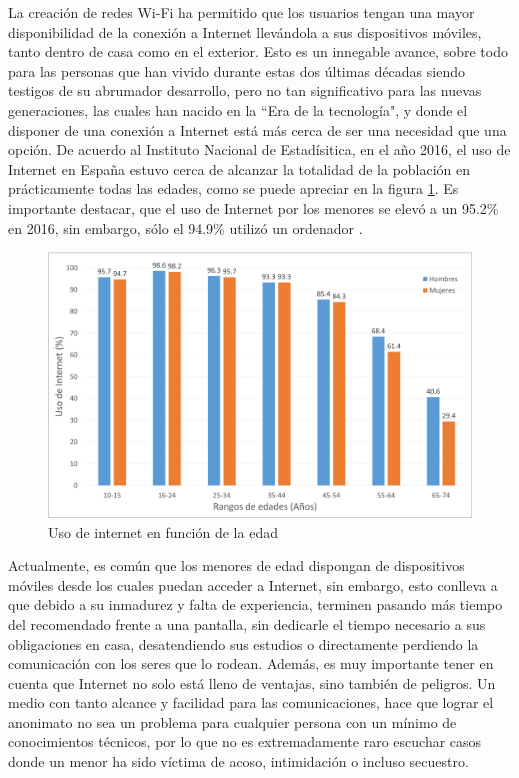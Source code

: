 \documentclass[12pt, twoside]{article}
\begin{document}
La creación de redes Wi-Fi ha permitido que los usuarios tengan una mayor disponibilidad de la conexión a Internet llevándola a sus dispositivos móviles, tanto dentro de casa como en el exterior. Esto es un innegable avance, sobre todo para las personas que han vivido durante estas dos últimas décadas siendo testigos de su abrumador desarrollo, pero no tan significativo para las nuevas generaciones, las cuales han nacido en la ``Era de la tecnología", y donde el disponer de una conexión a Internet está más cerca de ser una necesidad que una opción. De acuerdo al Instituto Nacional de Estadísitica, en el año 2016, el uso de Internet en España estuvo cerca de alcanzar la totalidad de la población en prácticamente todas las edades, como se puede apreciar en la figura \ref{fig:internet_ages}. Es importante destacar, que el uso de Internet por los menores se elevó a un 95.2\% en 2016, sin embargo, sólo el 94.9\% utilizó un ordenador \cite{EncuestaTIC}.

\begin{figure}[h!]
    \centering
        \includegraphics[scale=0.5]{internet_ages.eps}
        \caption{Uso de internet en función de la edad}
        \label{fig:internet_ages}
\end{figure}

Actualmente, es común que los menores de edad dispongan de dispositivos móviles desde los cuales puedan acceder a Internet, sin embargo, esto conlleva a que debido a su inmadurez y falta de experiencia, terminen pasando más tiempo del recomendado frente a una pantalla, sin dedicarle el tiempo necesario a sus obligaciones en casa, desatendiendo sus estudios o directamente perdiendo la comunicación con los seres que lo rodean. Además, es muy importante tener en cuenta que Internet no solo está lleno de ventajas, sino también de peligros. Un medio con tanto alcance y facilidad para las comunicaciones, hace que lograr el anonimato no sea un problema para cualquier persona con un mínimo de conocimientos técnicos, por lo que no es extremadamente raro escuchar casos donde un menor ha sido víctima de acoso, intimidación o incluso secuestro.
\end{document}
